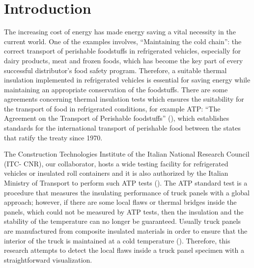 

% 

\newpage
\section{Introduction}

The increasing cost of energy has made energy saving a vital necessity in the current world. One of the examples involves, “Maintaining the cold chain”: the correct transport of perishable foodstuffs in refrigerated vehicles, especially for dairy products, meat and frozen foods, which has become the key part of every successful distributor’s food safety program. Therefore, a suitable thermal insulation implemented in refrigerated vehicles is essential for saving energy while maintaining an appropriate conservation of the foodstuffs. There are some agreements concerning thermal insulation tests which ensures the suitability for the transport of food in refrigerated conditions, for example ATP: “The Agreement on the Transport of Perishable foodstuffs” (\citet{Geneva1970}), which establishes standards for the international transport of perishable food between the states that ratify the treaty since 1970.

The Construction Technologies Institute of the Italian National Research Council (ITC- CNR), our collaborator, hosts a wide testing facility for refrigerated vehicles or insulated roll containers and it is also authorized by the Italian Ministry of Transport to perform such ATP tests (\citet{Tassou2009,dragano2009experimental}). The ATP standard test is a procedure that measures the insulating performance of truck panels with a global approach; however, if there are some local flaws or thermal bridges inside the panels, which could not be measured by ATP tests, then the insulation and the stability of the temperature can no longer be guaranteed. Usually truck panels are manufactured from composite insulated materials in order to ensure that the interior of the truck is maintained at a cold temperature (\citet{bortolin2015thermographic}). Therefore, this research attempts to detect the local flaws inside a truck panel specimen with a straightforward visualization.


